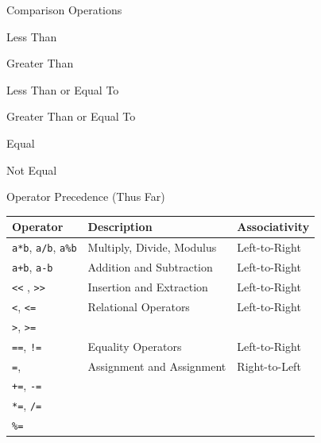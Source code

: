 \documentclass[]{beamer}
\begin{document}
\begin{frame}{Comparison Operations}
    \begin{description}[<+->]
        \item[\texttt{<}] Less Than
        \item[\texttt{>}] Greater Than
        \item[\texttt{<=}] Less Than or Equal To
        \item[\texttt{>=}] Greater Than or Equal To
    \end{description}

    \begin{description}[<+->]
        \item[\texttt{==}] Equal
        \item[\texttt{!=}] Not Equal
    \end{description}
\end{frame}

\begin{frame}{Operator Precedence (Thus Far)}
    \begin{tabular}{|l|l|l|}
        \hline
        \textbf{Operator} & \textbf{Description} & \textbf{Associativity} \\
        \hline
        \texttt{a*b}, \texttt{a/b}, \texttt{a\%b} & Multiply, Divide, Modulus & Left-to-Right\\
        \hline
        \texttt{a+b}, \texttt{a-b} & Addition and Subtraction & Left-to-Right\\
        \hline
        \texttt{<<} , \texttt{>>} & Insertion and Extraction & Left-to-Right \\
        \hline
        \texttt{<}, \texttt{<=} & Relational Operators & Left-to-Right\\
        \texttt{>}, \texttt{>=} & & \\
        \hline
        \texttt{==}, \texttt{!=} & Equality Operators & Left-to-Right\\
        \hline
        \texttt{=},  & Assignment and Assignment & Right-to-Left \\
        \texttt{+=}, \texttt{-=} & & \\
        \texttt{*=}, \texttt{/=} & & \\
        \texttt{\%=} & & \\
        \hline
    \end{tabular}
\end{frame}
\end{document}
